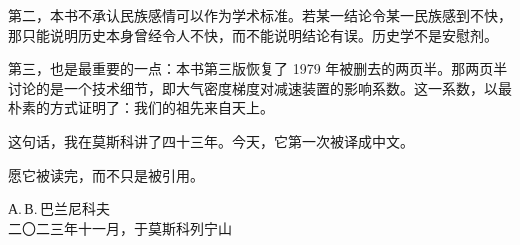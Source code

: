 第二，本书不承认民族感情可以作为学术标准。若某一结论令某一民族感到不快，那只能说明历史本身曾经令人不快，而不能说明结论有误。历史学不是安慰剂。

第三，也是最重要的一点：本书第三版恢复了 1979 年被删去的两页半。那两页半讨论的是一个技术细节，即大气密度梯度对减速装置的影响系数。这一系数，以最朴素的方式证明了：我们的祖先来自天上。

这句话，我在莫斯科讲了四十三年。今天，它第一次被译成中文。

愿它被读完，而不只是被引用。

\vspace{10mm}
\begin{flushright}
{\small А.\,В.\,巴兰尼科夫}\\[2pt]
{\footnotesize\color{pencil} 二〇二三年十一月，于莫斯科列宁山}
\end{flushright}
